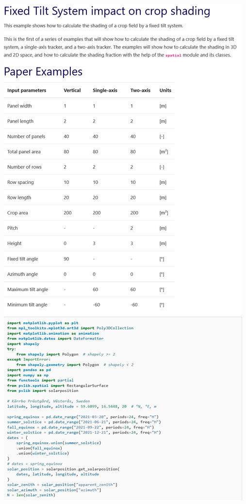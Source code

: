\begin{myparindent}{0pt}
\includegraphics[width=\linewidth,height=0.9\textheight,keepaspectratio]{images/docs_examples_cut/shading_anim_0.png}


\end{myparindent}
